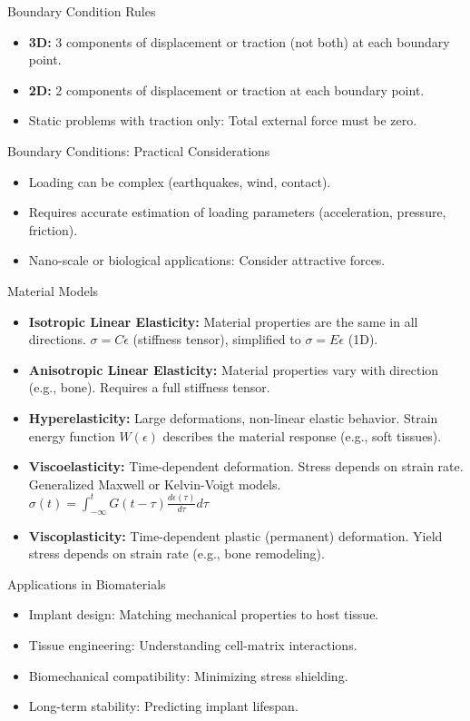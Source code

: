 \documentclass{beamer}
\begin{document}
\begin{frame}{Boundary Condition Rules}
  \begin{itemize}
    \item \textbf{3D:} 3 components of displacement or traction (not both) at each boundary point.
    \item \textbf{2D:} 2 components of displacement or traction at each boundary point.
    \item Static problems with traction only: Total external force must be zero.
  \end{itemize}
\end{frame}

\begin{frame}{Boundary Conditions: Practical Considerations}
  \begin{itemize}
    \item Loading can be complex (earthquakes, wind, contact).
    \item Requires accurate estimation of loading parameters (acceleration, pressure, friction).
    \item Nano-scale or biological applications: Consider attractive forces.
  \end{itemize}
\end{frame}

\begin{frame}{Material Models}
    \begin{itemize}
        \item \textbf{Isotropic Linear Elasticity:} Material properties are the same in all directions. $\sigma = C \epsilon$ (stiffness tensor), simplified to $\sigma = E \epsilon$ (1D).
        \item \textbf{Anisotropic Linear Elasticity:} Material properties vary with direction (e.g., bone). Requires a full stiffness tensor.
        \item \textbf{Hyperelasticity:} Large deformations, non-linear elastic behavior. Strain energy function $W(\epsilon)$ describes the material response (e.g., soft tissues).
        \item \textbf{Viscoelasticity:} Time-dependent deformation. Stress depends on strain rate. Generalized Maxwell or Kelvin-Voigt models. $\sigma(t) = \int_{-\infty}^{t} G(t-\tau) \frac{d\epsilon(\tau)}{d\tau} d\tau$
        \item \textbf{Viscoplasticity:} Time-dependent plastic (permanent) deformation. Yield stress depends on strain rate (e.g., bone remodeling).
    \end{itemize}
\end{frame}

\begin{frame}{Applications in Biomaterials}
  \begin{itemize}
    \item Implant design: Matching mechanical properties to host tissue.
    \item Tissue engineering: Understanding cell-matrix interactions.
    \item Biomechanical compatibility: Minimizing stress shielding.
    \item Long-term stability: Predicting implant lifespan.
  \end{itemize}
\end{frame}
\end{document}
